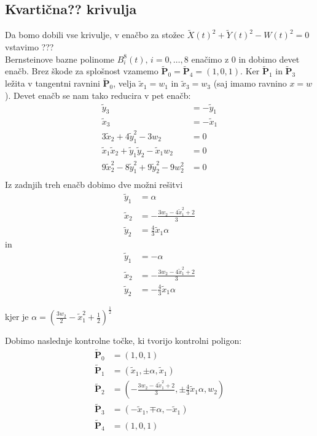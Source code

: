 \documentclass[a4paper,11pt]{article}
\theoremstyle{definition}
\theoremstyle{plain}
\begin{document}
\subsection{Kvartična?? krivulja}
Da bomo dobili vse krivulje, v enačbo za stožec $\tilde{X}(t)^2+\tilde{Y}(t)^2-W(t)^2=0$ vstavimo ??? \\
Bernsteinove bazne polinome $B_i^8(t),\,i=0,\ldots,8$ enačimo z $0$ in dobimo devet enačb.
Brez škode za splošnost vzamemo $\boldsymbol{\tilde{P}}_0 =\boldsymbol{\tilde{P}}_4 = (1,0,1)$. Ker $\boldsymbol{\tilde{P}}_1$ in $\boldsymbol{\tilde{P}}_3$ ležita v tangentni ravnini $\boldsymbol{\tilde{P}}_0$, velja $\tilde{x}_1=w_1$ in $\tilde{x}_3=w_3$ (saj imamo ravnino $x=w$). Devet enačb se nam tako reducira v pet enačb:
\begin{align*}
\tilde{y}_3 &=- \tilde{y}_1 \\
\tilde{x}_3 &= - \tilde{x}_1 \\
3\tilde{x}_2 + 4\tilde{y}_1^2 - 3w_2 &= 0 \\
\tilde{x}_1\tilde{x}_2 + \tilde{y}_1\tilde{y}_2  - \tilde{x}_1w_2 &= 0 \\
9\tilde{x}_2^2 - 8\tilde{y}_1^2 + 9\tilde{y}_2^2 - 9w_2^2&= 0 \\
\end{align*}
Iz zadnjih treh enačb dobimo dve možni rešitvi
\begin{align*}
\tilde{y}_1 &= \alpha \\
\tilde{x}_2 &=-\frac{3w_2-4\tilde{x}_1^2+2}{3}\\
\tilde{y}_2 &= \frac{4}{3}\tilde{x}_1\alpha
\end{align*}
in
\begin{align*}
\tilde{y}_1 &= -\alpha \\
\tilde{x}_2 &=-\frac{3w_2-4\tilde{x}_1^2+2}{3}\\
\tilde{y}_2 &= -\frac{4}{3}\tilde{x}_1\alpha
\end{align*}

kjer je $\alpha=(\frac{3w_2}{2}-\tilde{x}_1^2+\frac{1}{2})^{\frac{1}{2}}$

Dobimo naslednje kontrolne točke, ki tvorijo kontrolni poligon:
\begin{align*}
\boldsymbol{\tilde{P}}_0 &= (1,0,1) \\
\boldsymbol{\tilde{P}}_1 &= (\tilde{x}_1,\pm\alpha,\tilde{x}_1) \\
\boldsymbol{\tilde{P}}_2 &= (-\frac{3w_2-4\tilde{x}_1^2+2}{3},\pm\frac{4}{3}\tilde{x}_1\alpha,w_2) \\
\boldsymbol{\tilde{P}}_3 &= (-\tilde{x}_1,\mp\alpha,-\tilde{x}_1) \\
\boldsymbol{\tilde{P}}_4 &= (1,0,1)
\end{align*}
\end{document}
